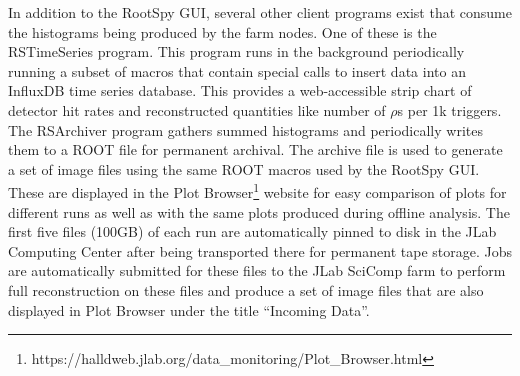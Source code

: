 
In addition to the RootSpy GUI, several other client programs exist that consume the histograms being produced by the farm nodes. One of these is the RSTimeSeries program. This program runs in the background periodically running a subset of macros that contain special calls to insert data into an InfluxDB time series database. This provides a web-accessible strip chart of detector hit rates and reconstructed quantities like number of $\rho$s per 1k triggers. The RSArchiver program gathers summed histograms and periodically writes them to a ROOT file for permanent archival. The archive file is used to generate a set of image files using the same ROOT macros used by the RootSpy GUI. These are displayed in the Plot Browser\footnote{https://halldweb.jlab.org/data\_monitoring/Plot\_Browser.html} website for easy comparison of plots for different runs as well as with the same plots produced during offline analysis. The first five files (100GB) of each run are automatically pinned to disk in the JLab Computing Center after being transported there for permanent tape storage. Jobs are automatically submitted for these files to the JLab SciComp farm to perform full reconstruction on these files and produce a set of image files that are also displayed in Plot Browser under the title ``Incoming Data''.



